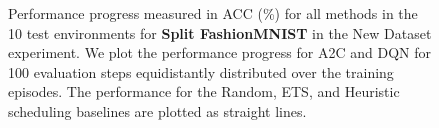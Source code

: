 \begin{figure}[t]
  \centering
  \setlength{\figwidth}{0.26\textwidth}
  \setlength{\figheight}{.14\textheight}
  
  \vspace{-3mm}
  \caption{Performance progress measured in ACC (\%) for all methods in the 10 test environments for {\bf Split FashionMNIST} in the New Dataset experiment. We plot the performance progress for A2C and DQN for 100 evaluation steps equidistantly distributed over the training episodes. The performance for the Random, ETS, and Heuristic scheduling baselines are plotted as straight lines.  }
  \label{fig:policy_rewards_fashionmnist_new_dataset_paperD}
  \vspace{-3mm}
\end{figure}


\begin{comment}
\clearpage

\clearpage

\clearpage

\clearpage

\clearpage

\clearpage

\end{comment}


